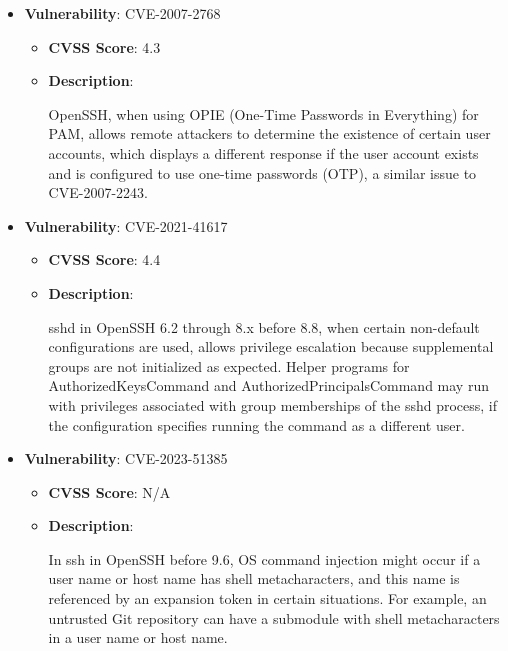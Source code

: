 \documentclass{article}
\begin{document}
\begin{itemize}
        \item \textbf{Vulnerability}: CVE-2007-2768
        \begin{itemize}
            \item \textbf{CVSS Score}:  4.3 
            \item \textbf{Description}:
            \parbox[t]{0.9\linewidth}{
                \ttfamily OpenSSH, when using OPIE (One-Time Passwords in Everything) for PAM, allows remote attackers to determine the existence of certain user accounts, which displays a different response if the user account exists and is configured to use one-time passwords (OTP), a similar issue to CVE-2007-2243.
            }
        \end{itemize}
    
        \item \textbf{Vulnerability}: CVE-2021-41617
        \begin{itemize}
            \item \textbf{CVSS Score}:  4.4 
            \item \textbf{Description}:
            \parbox[t]{0.9\linewidth}{
                \ttfamily sshd in OpenSSH 6.2 through 8.x before 8.8, when certain non-default configurations are used, allows privilege escalation because supplemental groups are not initialized as expected. Helper programs for AuthorizedKeysCommand and AuthorizedPrincipalsCommand may run with privileges associated with group memberships of the sshd process, if the configuration specifies running the command as a different user.
            }
        \end{itemize}
    
        \item \textbf{Vulnerability}: CVE-2023-51385
        \begin{itemize}
            \item \textbf{CVSS Score}:  N/A 
            \item \textbf{Description}:
            \parbox[t]{0.9\linewidth}{
                \ttfamily In ssh in OpenSSH before 9.6, OS command injection might occur if a user name or host name has shell metacharacters, and this name is referenced by an expansion token in certain situations. For example, an untrusted Git repository can have a submodule with shell metacharacters in a user name or host name.
            }
        \end{itemize}
    

\end{itemize}
\end{document}
